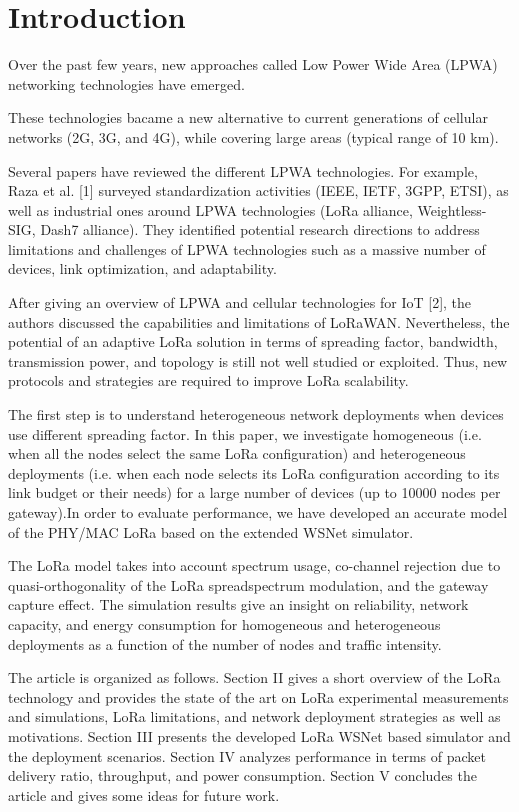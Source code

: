 \section{Introduction} \label{sec:Introduction}

Over the past few years,
	new approaches called Low Power Wide Area (LPWA) networking technologies have emerged.

These technologies bacame a new alternative to current generations of cellular networks (2G, 3G, and 4G),
	while covering large areas (typical range of 10 km).

Several papers have reviewed the different LPWA technologies.
For example,
	Raza et al. [1] surveyed standardization activities (IEEE, IETF, 3GPP, ETSI),
	as well as industrial ones around LPWA technologies (LoRa alliance, Weightless-SIG, Dash7 alliance).
They identified potential research directions to address limitations and challenges of LPWA technologies such as a massive number of devices,
	link optimization, and adaptability.

After giving an overview of LPWA and cellular technologies for IoT [2],
	the authors discussed the capabilities and limitations of LoRaWAN.
Nevertheless,
	the potential of an adaptive LoRa solution in terms of spreading factor,
	bandwidth,
	transmission power,
	and topology is still not well studied or exploited.
Thus,
	new protocols and strategies are required to improve LoRa scalability.

The first step is to understand heterogeneous network deployments when devices use different spreading factor.
In this paper,
	we investigate homogeneous (i.e.
when all the nodes select the same LoRa configuration) and heterogeneous deployments (i.e.
when each node selects its LoRa configuration according to its link budget or their needs) for a large number of devices (up to 10000 nodes per gateway).In order to evaluate performance,
	we have developed an accurate model of the PHY/MAC LoRa based on the extended WSNet simulator.

The LoRa model takes into account spectrum usage,
	co-channel rejection due to quasi-orthogonality of the LoRa spreadspectrum modulation,
	and the gateway capture effect.
The simulation results give an insight on reliability,
	network capacity,
	and energy consumption for homogeneous and heterogeneous deployments as a function of the number of nodes and traffic intensity.

The article is organized as follows.
Section II gives a short overview of the LoRa technology and provides the state of the art on LoRa experimental measurements and simulations,
	LoRa limitations,
	and network deployment strategies as well as motivations.
Section III presents the developed LoRa WSNet based simulator and the deployment scenarios.
Section IV analyzes performance in terms of packet delivery ratio,
	throughput,
	and power consumption.
Section V concludes the article and gives some ideas for future work.




